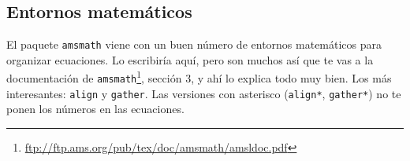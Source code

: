 \documentclass{apuntes}
\begin{document}
\subsection{Entornos matemáticos}

El paquete \texttt{amsmath} viene con un buen número de entornos matemáticos para organizar ecuaciones. Lo escribiría aquí, pero son muchos así que te vas a la documentación de \texttt{amsmath}\footnote{\url{ftp://ftp.ams.org/pub/tex/doc/amsmath/amsldoc.pdf}}, sección 3, y ahí lo explica todo muy bien. Los más interesantes: \texttt{align} y \texttt{gather}. Las versiones con asterisco (\texttt{align*}, \texttt{gather*}) no te ponen los números en las ecuaciones.

\newpage
\printindex
\end{document}

